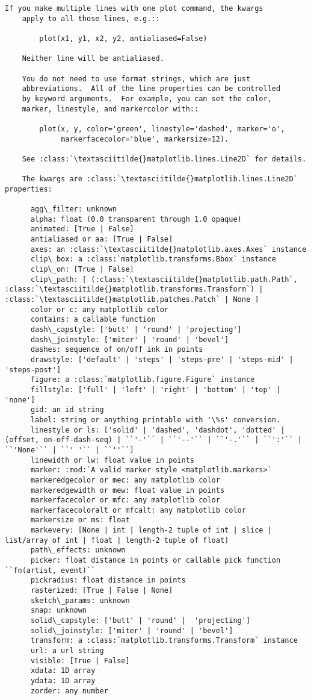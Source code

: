 \documentclass[11pt]{article}
\begin{document}
\begin{Verbatim}[commandchars=\\\{\}]
    If you make multiple lines with one plot command, the kwargs
    apply to all those lines, e.g.::
    
        plot(x1, y1, x2, y2, antialiased=False)
    
    Neither line will be antialiased.
    
    You do not need to use format strings, which are just
    abbreviations.  All of the line properties can be controlled
    by keyword arguments.  For example, you can set the color,
    marker, linestyle, and markercolor with::
    
        plot(x, y, color='green', linestyle='dashed', marker='o',
             markerfacecolor='blue', markersize=12).
    
    See :class:`\textasciitilde{}matplotlib.lines.Line2D` for details.
    
    The kwargs are :class:`\textasciitilde{}matplotlib.lines.Line2D` properties:
    
      agg\_filter: unknown
      alpha: float (0.0 transparent through 1.0 opaque) 
      animated: [True | False] 
      antialiased or aa: [True | False] 
      axes: an :class:`\textasciitilde{}matplotlib.axes.Axes` instance 
      clip\_box: a :class:`matplotlib.transforms.Bbox` instance 
      clip\_on: [True | False] 
      clip\_path: [ (:class:`\textasciitilde{}matplotlib.path.Path`, :class:`\textasciitilde{}matplotlib.transforms.Transform`) | :class:`\textasciitilde{}matplotlib.patches.Patch` | None ] 
      color or c: any matplotlib color 
      contains: a callable function 
      dash\_capstyle: ['butt' | 'round' | 'projecting'] 
      dash\_joinstyle: ['miter' | 'round' | 'bevel'] 
      dashes: sequence of on/off ink in points 
      drawstyle: ['default' | 'steps' | 'steps-pre' | 'steps-mid' | 'steps-post'] 
      figure: a :class:`matplotlib.figure.Figure` instance 
      fillstyle: ['full' | 'left' | 'right' | 'bottom' | 'top' | 'none'] 
      gid: an id string 
      label: string or anything printable with '\%s' conversion. 
      linestyle or ls: ['solid' | 'dashed', 'dashdot', 'dotted' | (offset, on-off-dash-seq) | ``'-'`` | ``'--'`` | ``'-.'`` | ``':'`` | ``'None'`` | ``' '`` | ``''``]
      linewidth or lw: float value in points 
      marker: :mod:`A valid marker style <matplotlib.markers>`
      markeredgecolor or mec: any matplotlib color 
      markeredgewidth or mew: float value in points 
      markerfacecolor or mfc: any matplotlib color 
      markerfacecoloralt or mfcalt: any matplotlib color 
      markersize or ms: float 
      markevery: [None | int | length-2 tuple of int | slice | list/array of int | float | length-2 tuple of float]
      path\_effects: unknown
      picker: float distance in points or callable pick function ``fn(artist, event)`` 
      pickradius: float distance in points 
      rasterized: [True | False | None] 
      sketch\_params: unknown
      snap: unknown
      solid\_capstyle: ['butt' | 'round' |  'projecting'] 
      solid\_joinstyle: ['miter' | 'round' | 'bevel'] 
      transform: a :class:`matplotlib.transforms.Transform` instance 
      url: a url string 
      visible: [True | False] 
      xdata: 1D array 
      ydata: 1D array 
      zorder: any number 
    

\end{Verbatim}
\end{document}
